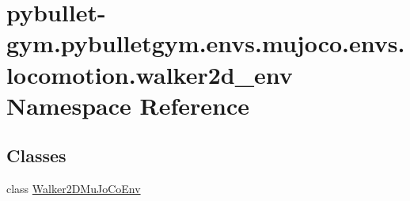 \hypertarget{namespacepybullet-gym_1_1pybulletgym_1_1envs_1_1mujoco_1_1envs_1_1locomotion_1_1walker2d__env}{}\section{pybullet-\/gym.pybulletgym.\+envs.\+mujoco.\+envs.\+locomotion.\+walker2d\+\_\+env Namespace Reference}
\label{namespacepybullet-gym_1_1pybulletgym_1_1envs_1_1mujoco_1_1envs_1_1locomotion_1_1walker2d__env}
\subsection*{Classes}
\begin{DoxyCompactItemize}
\item 
class \hyperlink{classpybullet-gym_1_1pybulletgym_1_1envs_1_1mujoco_1_1envs_1_1locomotion_1_1walker2d__env_1_1_walker2_d_mu_jo_co_env}{Walker2\+D\+Mu\+Jo\+Co\+Env}
\end{DoxyCompactItemize}
